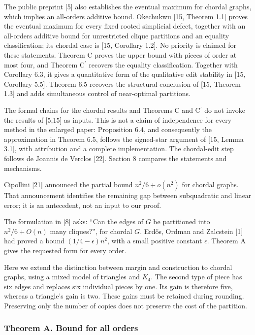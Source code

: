 \documentclass[english,11pt,a4paper]{article}
\begin{document}
The public preprint {[}5{]} also establishes the eventual maximum for chordal graphs, which implies an all-orders additive bound. Okechukwu {[}15, Theorem 1.1{]} proves the eventual maximum for every fixed rooted simplicial defect, together with an all-orders additive bound for unrestricted clique partitions and an equality classification; its chordal case is {[}15, Corollary 1.2{]}. No priority is claimed for these statements. Theorem C proves the upper bound with pieces of order at most four, and Theorem \texorpdfstring{C\ensuremath{^{\prime}}}{C'} recovers the equality classification. Together with Corollary 6.3, it gives a quantitative form of the qualitative edit stability in {[}15, Corollary 5.5{]}. Theorem 6.5 recovers the structural conclusion of {[}15, Theorem 1.3{]} and adds simultaneous control of near-optimal partitions.

The formal chains for the chordal results and Theorems C and \texorpdfstring{C\ensuremath{^{\prime}}}{C'} do not invoke the results of {[}5,15{]} as inputs. This is not a claim of independence for every method in the enlarged paper: Proposition 6.4, and consequently the approximation in Theorem 6.5, follows the signed-star argument of {[}15, Lemma 3.1{]}, with attribution and a complete implementation. The chordal-edit step follows de Joannis de Verclos {[}22{]}. Section 8 compares the statements and mechanisms.

Cipollini {[}21{]} announced the partial bound \(n^2/6+o(n^2)\) for chordal graphs. That announcement identifies the remaining gap between subquadratic and linear error; it is an antecedent, not an input to our proof.

The formulation in {[}8{]} asks: ``Can the edges of \(G\) be partitioned into \(n^2/6+O(n)\) many cliques?'', for chordal \(G\). Erdős, Ordman and Zalcstein {[}1{]} had proved a bound \((1/4-\epsilon)n^2\), with a small positive constant \(\epsilon\). Theorem A gives the requested form for every order.

Here we extend the distinction between margin and construction to chordal graphs, using a mixed model of triangles and \(K_4\). The second type of piece has six edges and replaces six individual pieces by one. Its gain is therefore five, whereas a triangle's gain is two. These gains must be retained during rounding. Preserving only the number of copies does not preserve the cost of the partition.

\subsubsection{Theorem A. Bound for all orders}\label{theorem-a.-bound-for-all-orders}
\end{document}
